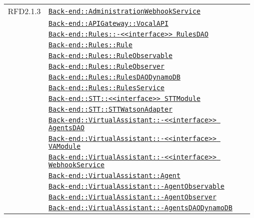 \begin{longtable}{|>{\centering}m{3cm}|m{10cm}<{\centering}|}
RFD2.1.3 & \hyperref[Back-end::AdministrationWebhookService]{\texttt{Back-end::AdministrationWebhookService}}\\
& \hyperref[Back-end::APIGateway::VocalAPI]{\texttt{Back-end::APIGateway::VocalAPI}}\\
& \hyperref[Back-end::Rules::<<interface>> RulesDAO]{\texttt{Back-end::Rules::-\linebreak <<interface>> RulesDAO}}\\
& \hyperref[Back-end::Rules::Rule]{\texttt{Back-end::Rules::Rule}}\\
& \hyperref[Back-end::Rules::RuleObservable]{\texttt{Back-end::Rules::RuleObservable}}\\
& \hyperref[Back-end::Rules::RuleObserver]{\texttt{Back-end::Rules::RuleObserver}}\\
& \hyperref[Back-end::Rules::RulesDAODynamoDB]{\texttt{Back-end::Rules::RulesDAODynamoDB}}\\
& \hyperref[Back-end::Rules::RulesService]{\texttt{Back-end::Rules::RulesService}}\\
& \hyperref[Back-end::STT::<<interface>> STTModule]{\texttt{Back-end::STT::<<interface>> STTModule}}\\
& \hyperref[Back-end::STT::STTWatsonAdapter]{\texttt{Back-end::STT::STTWatsonAdapter}}\\
& \hyperref[Back-end::VirtualAssistant::<<interface>> AgentsDAO]{\texttt{Back-end::VirtualAssistant::-\linebreak <<interface>> AgentsDAO}}\\
& \hyperref[Back-end::VirtualAssistant::<<interface>> VAModule]{\texttt{Back-end::VirtualAssistant::-\linebreak <<interface>> VAModule}}\\
& \hyperref[Back-end::VirtualAssistant::<<interface>> WebhookService]{\texttt{Back-end::VirtualAssistant::-\linebreak <<interface>> WebhookService}}\\
& \hyperref[Back-end::VirtualAssistant::Agent]{\texttt{Back-end::VirtualAssistant::Agent}}\\
& \hyperref[Back-end::VirtualAssistant::AgentObservable]{\texttt{Back-end::VirtualAssistant::-\linebreak AgentObservable}}\\
& \hyperref[Back-end::VirtualAssistant::AgentObserver]{\texttt{Back-end::VirtualAssistant::-\linebreak AgentObserver}}\\
& \hyperref[Back-end::VirtualAssistant::AgentsDAODynamoDB]{\texttt{Back-end::VirtualAssistant::-\linebreak AgentsDAODynamoDB}}\\

\end{longtable}
